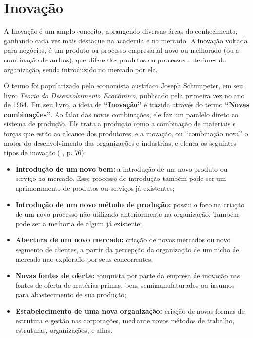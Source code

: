 \section{Inovação}
\label{inovacao}

A Inovação é um amplo conceito, abrangendo diversas áreas do conhecimento, ganhando cada vez mais destaque na academia e no mercado. A inovação voltada para negócios, é um produto ou processo empresarial novo ou melhorado (ou a combinação de ambos), que difere dos produtos ou processos anteriores da organização, sendo introduzido no mercado por ela. \cite{ocde2018}

O termo foi popularizado pelo economista austríaco Joseph Schumpeter, em seu livro \textit{Teoria do Desenvolvimento Econômico,} publicado pela primeira vez no ano de 1964. Em seu livro, a ideia de \textbf{“Inovação”} é trazida através do termo \textbf{“Novas combinações”}. Ao falar das novas combinações, ele faz um paralelo direto ao sistema de produção. Ele trata a produção como a combinação de materiais e forças que estão ao alcance dos produtores, e a inovação, ou “combinação nova” o motor do desenvolvimento das organizações e industrias, e elenca os seguintes tipos de inovação (\citeauthor{schumpeter1997} \citeyear{schumpeter1997}, p. 76):

\begin{itemize}
    \item \textbf{Introdução de um novo bem:} a introdução de um novo produto ou serviço no mercado. Esse processo de introdução também pode ser um aprimoramento de produtos ou serviços já existentes;
    \item \textbf{Introdução de um novo método de produção:} possui o foco na criação de um novo processo não utilizado anteriormente na organização. Também pode ser a melhoria de algum já existente;
    \item \textbf{Abertura de um novo mercado:} criação de novos mercados ou novo segmento de clientes, a partir da percepção da organização de um nicho de mercado não explorado por seus concorrentes;
    \item \textbf{Novas fontes de oferta:} conquista por parte da empresa de inovação nas fontes de oferta de matérias-primas, bens semimanufaturados ou insumos para abastecimento de sua produção;
    \item \textbf{Estabelecimento de uma nova organização:} criação de novas formas de estrutura e gestão nas corporações, mediante novos métodos de trabalho, estruturas, organizações, e afins.
\end{itemize}


